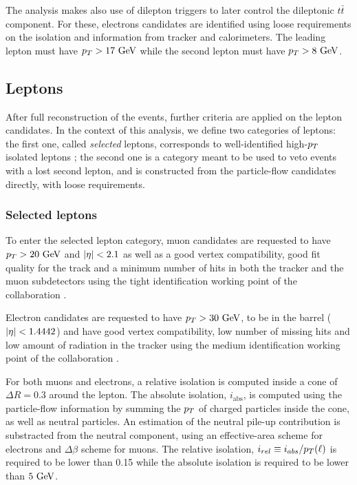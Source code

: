     The analysis makes also use of dilepton triggers to later control the dileptonic
    $t\bar{t}$ component. For these, electrons candidates are identified using loose
    requirements on the isolation and information from tracker and calorimeters. The
    leading lepton must have $p_T > 17~\text{GeV}$ while the second lepton must have $p_T > 8~\text{GeV}$.

        \subsection{Leptons}

    After full reconstruction of the events, further criteria are applied on the lepton
    candidates. In the context of this analysis, we define two categories of leptons:
    the first one, called \emph{selected} leptons, corresponds to well-identified high-$p_T$
    isolated leptons ; the second one is a category meant to be used to veto events with
    a lost second lepton, and is constructed from the particle-flow candidates directly,
    with loose requirements.

            \subsubsection{Selected leptons}

        To enter the selected lepton category, muon candidates are requested to have
    $p_T > 20~\text{GeV}$ and $\left| \eta \right| < 2.1$ as well as a good vertex compatibility, good fit
    quality for the track and a minimum number of hits in both the tracker and the muon
    subdetectors using the tight identification working point of the collaboration
    \cite{MuonID}.

        Electron candidates are requested to have $p_T > 30~\text{GeV}$, to be in the barrel
    ($\left| \eta \right| < 1.4442$) and have good vertex compatibility, low number of missing hits
    and low amount of radiation in the tracker using the medium identification working
    point of the collaboration \cite{ElectronID}.

    For both muons and electrons, a relative isolation is computed inside a cone of
    $\Delta R = 0.3$ around the lepton. The absolute isolation, $i_\text{abs}$, is computed
    using the particle-flow information by summing the $p_T$ of charged particles inside
    the cone, as well as neutral particles. An estimation of the neutral pile-up
    contribution is substracted from the neutral component, using an effective-area scheme
    for electrons and $\Delta \beta$ scheme for muons. The relative isolation, $i_{rel}
    \equiv i_{abs} / p_T(\ell)$ is required
    to be lower than 0.15 while the absolute isolation is required to be lower than $5~\text{GeV}$.

